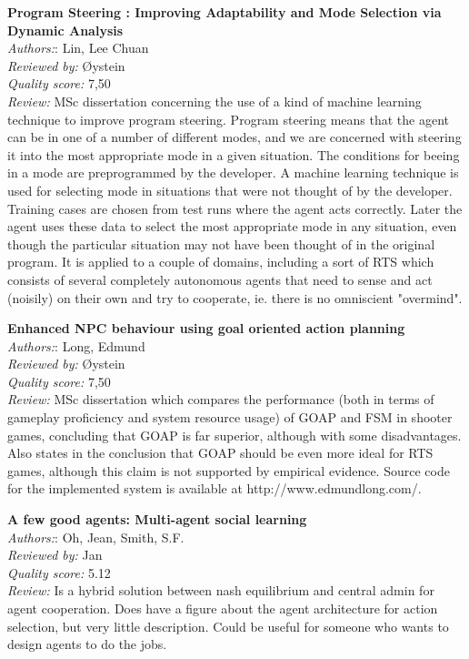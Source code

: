 \textbf{Program Steering : Improving Adaptability and Mode Selection via Dynamic Analysis}\\
\textit{Authors:}: Lin, Lee Chuan\\
\textit{Reviewed by:} Øystein\\
\textit{Quality score:} 7,50\\
\textit{Review:} MSc dissertation concerning the use of a kind of machine learning technique to improve program steering. Program steering means that the agent can be in one of a number of different modes, and we are concerned with steering it into the most appropriate mode in a given situation. The conditions for beeing in a mode are preprogrammed by the developer. A machine learning technique is used for selecting mode in situations that were not thought of by the developer. Training cases are chosen from test runs where the agent acts correctly. Later the agent uses these data to select the most appropriate mode in any situation, even though the particular situation may not have been thought of in the original program. It is applied to a couple of domains, including a sort of RTS which consists of several completely autonomous agents that need to sense and act (noisily) on their own and try to cooperate, ie. there is no omniscient "overmind".

\textbf{Enhanced NPC behaviour using goal oriented action planning}\\
\textit{Authors:}: Long, Edmund\\
\textit{Reviewed by:} Øystein\\
\textit{Quality score:} 7,50\\
\textit{Review:} MSc dissertation which compares the performance (both in terms of gameplay proficiency and system resource usage) of GOAP and FSM in shooter games, concluding that GOAP is far superior, although with some disadvantages. Also states in the conclusion that GOAP should be even more ideal for RTS games, although this claim is not supported by empirical evidence. Source code for the implemented system is available at http://www.edmundlong.com/.


\textbf{A few good agents: Multi-agent social learning}\\
\textit{Authors:}: Oh, Jean, Smith, S.F.\\
\textit{Reviewed by:} Jan\\
\textit{Quality score:} 5.12\\
\textit{Review:} Is a hybrid solution between nash equilibrium and central admin for agent cooperation. Does have a figure about the agent architecture for action selection, but very little description. Could be useful for someone who wants to design agents to do the jobs.

